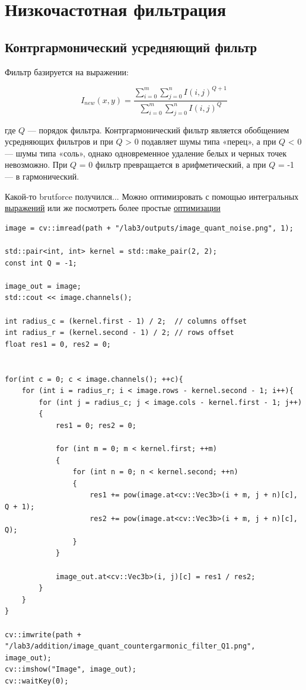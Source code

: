 \pagebreak

\section{Низкочастотная фильтрация}

\subsection{Контргармонический усредняющий фильтр}

Фильтр базируется на выражении:

\begin{equation}
    I_{new}(x, y) = \frac{\sum_{i=0}^{m}\sum_{j=0}^{n} I(i, j) ^ {Q+1}}{\sum_{i=0}^{m}\sum_{j=0}^{n} I(i, j) ^ Q}
\label{eq:complex_func}
\end{equation}

где $Q$ — порядок фильтра. Контргармонический фильтр является
обобщением усредняющих фильтров и при $Q$ > 0 подавляет шумы
типа «перец», а при $Q$ < 0 — шумы типа «соль», однако одновременное удаление 
белых и черных точек невозможно. При $Q$ = 0 фильтр превращается в арифметический, 
а при $Q$ = -1 — в гармонический.

Какой-то brutforce получился... Можно оптимизровать с помощью интегральных \href{https://en.wikipedia.org/wiki/Summed-area_table}{выражений} или же посмотреть более простые \href{https://github.com/BBuf/Image-processing-algorithm}{оптимизации}

\begin{lstlisting}[style=cpp_white, caption={Исходный код для контргармонического усредняющего фильтра}]
image = cv::imread(path + "/lab3/outputs/image_quant_noise.png", 1);

std::pair<int, int> kernel = std::make_pair(2, 2);
const int Q = -1;

image_out = image;
std::cout << image.channels();

int radius_c = (kernel.first - 1) / 2;  // columns offset
int radius_r = (kernel.second - 1) / 2; // rows offset
float res1 = 0, res2 = 0;


for(int c = 0; c < image.channels(); ++c){
    for (int i = radius_r; i < image.rows - kernel.second - 1; i++){
        for (int j = radius_c; j < image.cols - kernel.first - 1; j++)
        {
            res1 = 0; res2 = 0;

            for (int m = 0; m < kernel.first; ++m)
            {
                for (int n = 0; n < kernel.second; ++n)
                {
                    res1 += pow(image.at<cv::Vec3b>(i + m, j + n)[c], Q + 1);
                    res2 += pow(image.at<cv::Vec3b>(i + m, j + n)[c], Q);
                }
            }

            image_out.at<cv::Vec3b>(i, j)[c] = res1 / res2;                                                            
        }
    }
}

cv::imwrite(path + "/lab3/addition/image_quant_countergarmonic_filter_Q1.png", image_out);
cv::imshow("Image", image_out);
cv::waitKey(0);
\end{lstlisting}

